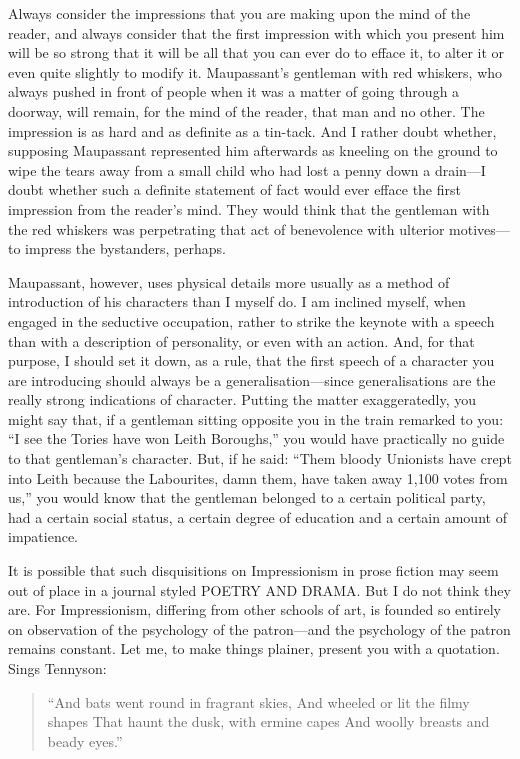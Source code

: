 Always consider the impressions that you are making upon the mind of the
reader, and always consider that the first impression with which you
present him will be so strong that it will be all that you can ever do
to efface it, to alter it or even quite slightly to modify it.
Maupassant's gentleman with red whiskers, who always pushed in front of
people when it was a matter of going through a doorway, will remain, for
the mind of the reader, that man and no other. The impression is as hard
and as definite as a tin-tack. And I rather doubt whether, supposing
Maupassant represented him afterwards as kneeling on the ground to wipe
the tears away from a small child who had lost a penny down a drain---I
doubt whether such a definite statement of fact would ever efface the
first impression from the reader's mind. They would think that the
gentleman with the red whiskers was perpetrating that act of benevolence
with ulterior motives---to impress the bystanders, perhaps.

Maupassant, however, uses physical details more usually as a method of
introduction of his characters than I myself do. I am inclined myself,
when engaged in the seductive occupation, rather to strike the keynote
with a speech than with a description of personality, or even with an
action. And, for that purpose, I should set it down, as a rule, that the
first speech of a character you are introducing should always be a
generalisation---since generalisations are the really strong indications
of character. Putting the matter exaggeratedly, you might say that, if a
gentleman sitting opposite you in the train remarked to you: ``I see the
Tories have won Leith Boroughs,'' you would have practically no guide to
that gentleman's character. But, if he said: ``Them bloody Unionists
have crept into Leith because the Labourites, damn them, have taken away
1,100 votes from us,'' you would know that the gentleman belonged to a
certain political party, had a certain social status, a certain degree
of education and a certain amount of impatience.

It is possible that such disquisitions on Impressionism in prose fiction
may seem out of place in a journal styled POETRY AND DRAMA. But I do not
think they are. For Impressionism, differing from other schools of art,
is founded so entirely on observation of the psychology of the
patron---and the psychology of the patron remains constant. Let me, to
make things plainer, present you with a quotation. Sings Tennyson:


\begin{verse} 

``And bats went round in fragrant skies, And wheeled or lit the filmy
shapes That haunt the dusk, with ermine capes And woolly breasts and
beady eyes.''


\end{verse} 

